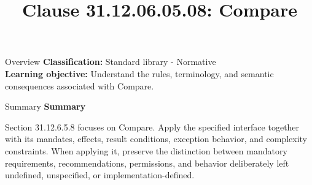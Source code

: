 \documentclass[10pt,letterpaper]{article}
\title{Clause 31.12.06.05.08: Compare}
\author{}
\date{}
\begin{document}
\maketitle
\begin{CornellOverviewBox}{Overview}
\textbf{Classification:} Standard library - Normative\\[2pt]
\textbf{Learning objective:} Understand the rules, terminology, and semantic consequences associated with Compare.
\end{CornellOverviewBox}\begin{CornellSummaryBox}{Summary}
{\sffamily\bfseries\color{Accent} Summary}\par\vspace{3pt}Section 31.12.6.5.8 focuses on Compare. Apply the specified interface together with its mandates, effects, result conditions, exception behavior, and complexity constraints. When applying it, preserve the distinction between mandatory requirements, recommendations, permissions, and behavior deliberately left undefined, unspecified, or implementation-defined.
\end{CornellSummaryBox}
\end{document}
